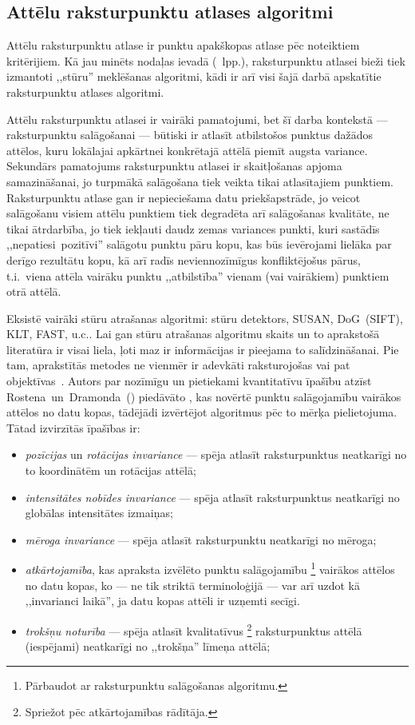 \subsection{Attēlu raksturpunktu atlases algoritmi} \label{sec:corners}
Attēlu raksturpunktu atlase ir punktu apakškopas atlase pēc noteiktiem
kritērijiem. Kā jau minēts nodaļas ievadā (\pageref{sec:algo}~lpp.),
raksturpunktu atlasei bieži tiek izmantoti ,,stūru'' meklēšanas algoritmi,
kādi ir arī visi šajā darbā apskatītie raksturpunktu atlases algoritmi.

Attēlu raksturpunktu atlasei ir vairāki pamatojumi, bet šī darba kontekstā
--- raksturpunktu salāgošanai --- būtiski ir atlasīt atbilstošos punktus
dažādos attēlos, kuru lokālajai apkārtnei konkrētajā attēlā piemīt
augsta variance. Sekundārs pamatojums raksturpunktu atlasei ir
skaitļošanas apjoma samazināšanai, jo turpmākā salāgošana tiek veikta
tikai atlasītajiem punktiem. Raksturpunktu atlase gan ir nepieciešama
datu priekšapstrāde, jo veicot salāgošanu visiem attēlu punktiem tiek
degradēta arī salāgošanas kvalitāte, ne tikai ātrdarbība, jo tiek
iekļauti daudz zemas variances punkti, kuri sastādīs
,,nepatiesi~pozitīvi'' salāgotu punktu pāru kopu, kas būs ievērojami
lielāka par derīgo rezultātu kopu, kā arī radīs neviennozīmīgus
konfliktējošus pārus,
t.i.~viena attēla vairāku punktu ,,atbilstība'' vienam (vai vairākiem)
punktiem otrā attēlā.

Eksistē vairāki stūru atrašanas algoritmi:  stūru detektors,
SUSAN, DoG~(SIFT), KLT, FAST, u.c.. 
Lai gan stūru atrašanas algoritmu skaits un to aprakstošā literatūra ir
visai liela, ļoti maz ir informācijas ir pieejama to salīdzināšanai. Pie
tam, aprakstītās metodes ne vienmēr ir adevkāti raksturojošas vai pat
objektīvas~\cite{Mokhtarian}\cite{FAST}. Autors par nozīmīgu un 
pietiekami kvantitatīvu īpašību atzīst 
Rostena~un~Dramonda\cite{FAST}~() piedāvāto
, kas novērtē punktu salāgojamību vairākos attēlos
no datu kopas, tādējādi izvērtējot algoritmus pēc to mērķa pielietojuma.
Tātad izvirzītās īpašības ir:
\begin{itemize}
	\item \emph{pozīcijas} un \emph{rotācijas invariance} --- spēja atlasīt
		raksturpunktus neatkarīgi no to koordinātēm un rotācijas attēlā;
	\item \emph{intensitātes nobīdes invariance} --- spēja atlasīt
		raksturpunktus neatkarīgi no globālas intensitātes izmaiņas;
	\item \emph{mēroga invariance} --- spēja atlasīt raksturpunktu
		neatkarīgi no mēroga;
	\item \emph{atkārtojamība}, kas apraksta izvēlēto punktu salāgojamību%
			\footnote{Pārbaudot ar raksturpunktu salāgošanas algoritmu.}
		vairākos attēlos no datu kopas, ko --- ne tik striktā terminoloģijā ---
		var arī uzdot kā ,,invarianci laikā'', ja datu kopas attēli ir
		uzņemti secīgi.
	\item \emph{trokšņu noturība} --- spēja atlasīt kvalitatīvus%
			\footnote{Spriežot pēc atkārtojamības rādītāja.}
		raksturpunktus attēlā (iespējami) neatkarīgi no ,,trokšņa'' līmeņa attēlā;
\end{itemize}


